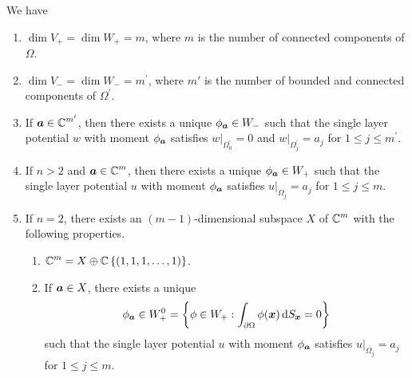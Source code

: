 \begin{prop} \label{pot_split_prop}
We have
\begin{enumerate}
\item $\dim V_+ = \dim W_+ = m$, where $m$ is the number of connected
components of $\Omega$.
\item $\displaystyle \dim V_- = \dim W_- = m^{\prime}$, where $m'$ is
the number of bounded and connected components of
$\displaystyle \Omega^{\prime}$.
\item If $\displaystyle {\bm{a}} \in \mathbb{C}^{m^{\prime}}$, then there
exists a unique $\phi_{{\bm{a}}} \in W_-$ such that the single layer
potential $w$ with moment $\phi_{{\bm{a}}}$ satisfies
$\displaystyle w\big|_{\Omega_0^{\prime}}=0$ and
$\displaystyle w\big|_{\Omega_j^{\prime}} = a_j$ for
$1 \leq j \leq m^{\prime}$.
\item If $n>2$ and $\displaystyle {\bm{a}} \in \mathbb{C}^m$, then there
exists a unique $\phi_{{\bm{a}}} \in W_+$ such that the single layer
potential $u$ with moment $\phi_{{\bm{a}}}$ satisfies
$\displaystyle u\big|_{\Omega_j} = a_j$
for $1 \leq j \leq m$.
\item If $n=2$, there exists an $(m-1)$-dimensional subspace $X$ of
$\displaystyle \mathbb{C}^m$ with the following properties.
\begin{enumerate}
\item $\displaystyle \mathbb{C}^m = X \oplus \mathbb{C}\left\{(1,1,1,\ldots,1)\right\}$.
\item If ${\bm{a}}\in X$, there exists a unique
\[
\phi_{{\bm{a}}} \in W_+^0 = \left\{ \phi \in W_+ :
\int_{\partial \Omega} \phi({\bm{x}}) \,\mathrm{d}{S}_{{\bm{x}}} = 0 \right\}
\]
such that the single layer potential $u$ with moment $\phi_{{\bm{a}}}$
satisfies $\displaystyle u\big|_{\Omega_j} = a_j$
for $1 \leq j \leq m$.
\end{enumerate}
\end{enumerate}
\end{prop}


